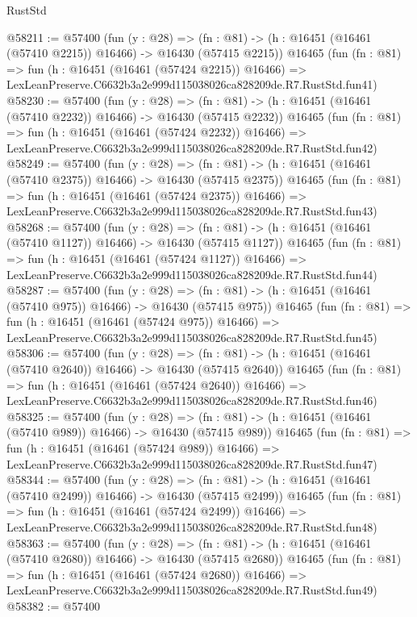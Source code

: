\begin{lexlean}{RustStd}
\begin{coremodule}
@58211 := @57400
    (fun (y : @28) =>
    (fn : @81) -> (h : @16451 (@16461 (@57410 @2215)) @16466) -> @16430 (@57415 @2215))
    @16465
    (fun (fn : @81) =>
    fun (h : @16451 (@16461 (@57424 @2215)) @16466) =>
    LexLeanPreserve.C6632b3a2e999d115038026ca828209de.R7.RustStd.fun41)
@58230 := @57400
    (fun (y : @28) =>
    (fn : @81) -> (h : @16451 (@16461 (@57410 @2232)) @16466) -> @16430 (@57415 @2232))
    @16465
    (fun (fn : @81) =>
    fun (h : @16451 (@16461 (@57424 @2232)) @16466) =>
    LexLeanPreserve.C6632b3a2e999d115038026ca828209de.R7.RustStd.fun42)
@58249 := @57400
    (fun (y : @28) =>
    (fn : @81) -> (h : @16451 (@16461 (@57410 @2375)) @16466) -> @16430 (@57415 @2375))
    @16465
    (fun (fn : @81) =>
    fun (h : @16451 (@16461 (@57424 @2375)) @16466) =>
    LexLeanPreserve.C6632b3a2e999d115038026ca828209de.R7.RustStd.fun43)
@58268 := @57400
    (fun (y : @28) =>
    (fn : @81) -> (h : @16451 (@16461 (@57410 @1127)) @16466) -> @16430 (@57415 @1127))
    @16465
    (fun (fn : @81) =>
    fun (h : @16451 (@16461 (@57424 @1127)) @16466) =>
    LexLeanPreserve.C6632b3a2e999d115038026ca828209de.R7.RustStd.fun44)
@58287 := @57400
    (fun (y : @28) =>
    (fn : @81) -> (h : @16451 (@16461 (@57410 @975)) @16466) -> @16430 (@57415 @975))
    @16465
    (fun (fn : @81) =>
    fun (h : @16451 (@16461 (@57424 @975)) @16466) =>
    LexLeanPreserve.C6632b3a2e999d115038026ca828209de.R7.RustStd.fun45)
@58306 := @57400
    (fun (y : @28) =>
    (fn : @81) -> (h : @16451 (@16461 (@57410 @2640)) @16466) -> @16430 (@57415 @2640))
    @16465
    (fun (fn : @81) =>
    fun (h : @16451 (@16461 (@57424 @2640)) @16466) =>
    LexLeanPreserve.C6632b3a2e999d115038026ca828209de.R7.RustStd.fun46)
@58325 := @57400
    (fun (y : @28) =>
    (fn : @81) -> (h : @16451 (@16461 (@57410 @989)) @16466) -> @16430 (@57415 @989))
    @16465
    (fun (fn : @81) =>
    fun (h : @16451 (@16461 (@57424 @989)) @16466) =>
    LexLeanPreserve.C6632b3a2e999d115038026ca828209de.R7.RustStd.fun47)
@58344 := @57400
    (fun (y : @28) =>
    (fn : @81) -> (h : @16451 (@16461 (@57410 @2499)) @16466) -> @16430 (@57415 @2499))
    @16465
    (fun (fn : @81) =>
    fun (h : @16451 (@16461 (@57424 @2499)) @16466) =>
    LexLeanPreserve.C6632b3a2e999d115038026ca828209de.R7.RustStd.fun48)
@58363 := @57400
    (fun (y : @28) =>
    (fn : @81) -> (h : @16451 (@16461 (@57410 @2680)) @16466) -> @16430 (@57415 @2680))
    @16465
    (fun (fn : @81) =>
    fun (h : @16451 (@16461 (@57424 @2680)) @16466) =>
    LexLeanPreserve.C6632b3a2e999d115038026ca828209de.R7.RustStd.fun49)
@58382 := @57400

\end{coremodule}
\end{lexlean}
